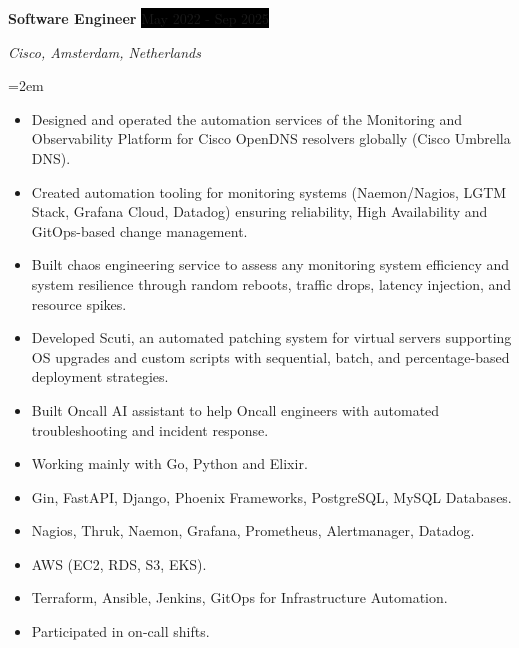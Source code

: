 \documentclass[paper=a4,fontsize=11pt]{scrartcl} %
\newcommand{\sepspace}{\vspace*{1em}}		%
\newcommand{\EducationEntry}[4]{
		\noindent \textbf{#1} \hfill      %
		\colorbox{Black}{%
			\parbox{6em}{%
			\hfill\color{White}#2}} \par  %
		\noindent \textit{#3} \par        %
		\noindent\hangindent=2em\hangafter=0 \small #4 %
		\normalsize \par}
\newcommand{\WorkEntry}[4]{				  %
		\noindent \textbf{#1} \hfill      %
		\colorbox{Black}{\color{White}#2} \par  %
		\noindent \textit{#3} \par              %
		\noindent\hangindent=2em\hangafter=0 \small #4 %
		\normalsize \par}
\begin{document}
\WorkEntry{Software Engineer}{May 2022 - Sep 2025}{Cisco, Amsterdam, Netherlands}{\begin{itemize}
\item Designed and operated the automation services of the Monitoring and Observability Platform for Cisco OpenDNS resolvers globally (Cisco Umbrella DNS).
\item Created automation tooling for monitoring systems (Naemon/Nagios, LGTM Stack, Grafana Cloud, Datadog) ensuring reliability, High Availability and GitOps-based change management.
\item Built chaos engineering service to assess any monitoring system efficiency and system resilience through random reboots, traffic drops, latency injection, and resource spikes.
\item Developed Scuti, an automated patching system for virtual servers supporting OS upgrades and custom scripts with sequential, batch, and percentage-based deployment strategies.
\item Built Oncall AI assistant to help Oncall engineers with automated troubleshooting and incident response.
\item Working mainly with Go, Python and Elixir.
\item Gin, FastAPI, Django, Phoenix Frameworks, PostgreSQL, MySQL Databases.
\item Nagios, Thruk, Naemon, Grafana, Prometheus, Alertmanager, Datadog.
\item AWS (EC2, RDS, S3, EKS).
\item Terraform, Ansible, Jenkins, GitOps for Infrastructure Automation.
\item Participated in on-call shifts.
\end{itemize}}
\sepspace
\end{document}
